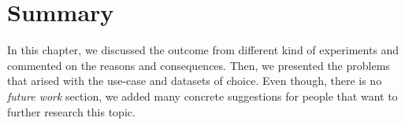 \section{Summary}

In this chapter, we discussed the outcome from different kind of experiments and commented on the reasons and consequences. Then, we presented the problems that arised with the use-case and datasets of choice. Even though, there is no \textit{future work} section, we added many concrete suggestions for people that want to further research this topic.
